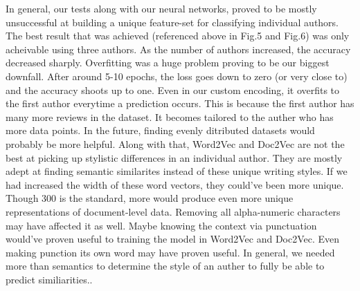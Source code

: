 \documentclass[conference]{IEEEtran}
\begin{document}
    In general, our tests along with our neural networks, proved to be mostly unsuccessful at building a unique feature-set for classifying individual authors. The best result that was achieved (referenced above in Fig.5 and Fig.6) was only acheivable using three authors. As the number of authors increased, the accuracy decreased sharply. Overfitting was a huge problem proving to be our biggest downfall. After around 5-10 epochs, the loss goes down to zero (or very close to) and the accuracy shoots up to one. Even in our custom encoding, it overfits to the first author everytime a prediction occurs. This is because the first author has many more reviews in the dataset. It becomes tailored to the auther who has more data points. In the future, finding evenly ditributed datasets would probably be more helpful. Along with that, Word2Vec and Doc2Vec are not the best at picking up stylistic differences in an individual author. They are mostly adept at finding semantic similarites instead of these unique writing styles. If we had increased the width of these word vectors, they could've been more unique. Though 300 is the standard, more would produce even more unique representations of document-level data. Removing all alpha-numeric characters may have affected it as well. Maybe knowing the context via punctuation would've proven useful to training the model in Word2Vec and Doc2Vec. Even making punction its own word may have proven useful. In general, we needed more than semantics to determine the style of an auther to fully be able to predict similiarities.\cite{b5}.


\end{document}
